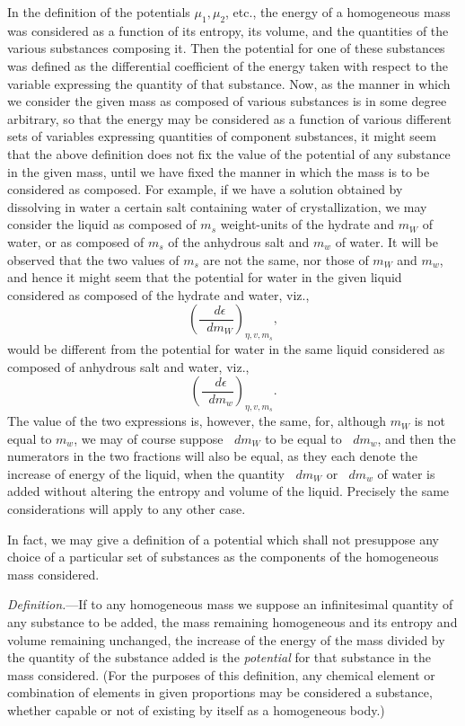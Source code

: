 \documentclass[11pt]{article}
\newcommand{\dd}{\mathop{}\!d}
\newcommand{\eps}{\epsilon}
\begin{document}
In the definition of the potentials \(\mu_1,\mu_2\), etc., the energy of a homogeneous mass was considered as a function of its entropy, its volume, and the quantities of the various substances composing it. Then the potential for one of these substances was defined as the differential coefficient of the energy taken with respect to the variable expressing the quantity of that substance. Now, as the manner in which we consider the given mass as composed of various substances is in some degree arbitrary, so that the energy may be considered as a function of various different sets of variables expressing quantities of component substances, it might seem that the above definition does not fix the value of the potential of any substance in the given mass, until we have fixed the manner in which the mass is to be considered as composed. For example, if we have a solution obtained by dissolving in water a certain salt containing water of crystallization, we may consider the liquid as composed of \(m_s\) weight-units of the hydrate and \(m_W\) of water, or as composed of \(m_s\) of the anhydrous salt and \(m_w\) of water. It will be observed that the two values of \(m_s\) are not the same, nor those of \(m_W\) and \(m_w\), and hence it might seem that the potential for water in the given liquid considered as composed of the hydrate and water, viz.,
\[
\left(\frac{\dd\eps}{\dd m_W}\right)_{\eta,v,m_s},
\]
would be different from the potential for water in the same liquid considered as composed of anhydrous salt and water, viz.,
\[
\left(\frac{\dd\eps}{\dd m_w}\right)_{\eta,v,m_s}.
\]
The value of the two expressions is, however, the same, for, although \(m_W\) is not equal to \(m_w\), we may of course suppose \(\dd m_W\) to be equal to \(\dd m_w\), and then the numerators in the two fractions will also be equal, as they each denote the increase of energy of the liquid, when the quantity \(\dd m_W\) or \(\dd m_w\) of water is added without altering the entropy and volume of the liquid. Precisely the same considerations will apply to any other case.

In fact, we may give a definition of a potential which shall not presuppose any choice of a particular set of substances as the components of the homogeneous mass considered.

\textit{Definition.}---If to any homogeneous mass we suppose an infinitesimal quantity of any substance to be added, the mass remaining homogeneous and its entropy and volume remaining unchanged, the increase of the energy of the mass divided by the quantity of the substance added is the \textit{potential} for that substance in the mass considered. (For the purposes of this definition, any chemical element or combination of elements in given proportions may be considered a substance, whether capable or not of existing by itself as a homogeneous body.)
\end{document}
